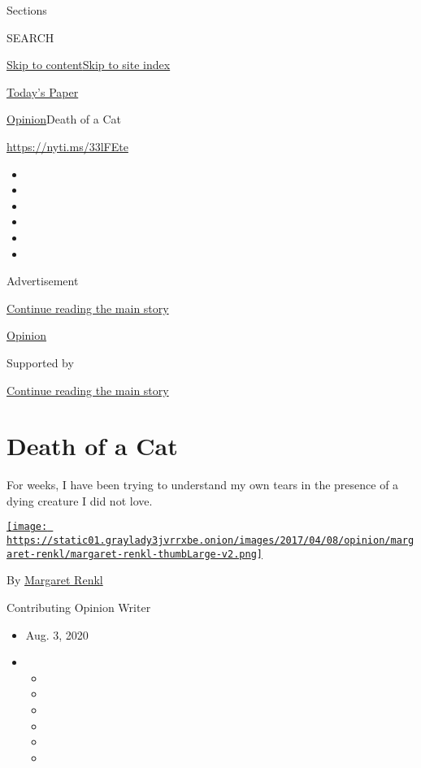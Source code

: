 Sections

SEARCH

\protect\hyperlink{site-content}{Skip to
content}\protect\hyperlink{site-index}{Skip to site index}

\href{https://myaccount.nytimes3xbfgragh.onion/auth/login?response_type=cookie\&client_id=vi}{}

\href{https://www.nytimes3xbfgragh.onion/section/todayspaper}{Today's
Paper}

\href{/section/opinion}{Opinion}\textbar{}Death of a Cat

\url{https://nyti.ms/33lFEte}

\begin{itemize}
\item
\item
\item
\item
\item
\item
\end{itemize}

Advertisement

\protect\hyperlink{after-top}{Continue reading the main story}

\href{/section/opinion}{Opinion}

Supported by

\protect\hyperlink{after-sponsor}{Continue reading the main story}

\hypertarget{death-of-a-cat}{%
\section{Death of a Cat}\label{death-of-a-cat}}

For weeks, I have been trying to understand my own tears in the presence
of a dying creature I did not love.

\href{https://www.nytimes3xbfgragh.onion/by/margaret-renkl}{\texttt{[image: https://static01.graylady3jvrrxbe.onion/images/2017/04/08/opinion/margaret-renkl/margaret-renkl-thumbLarge-v2.png]}}

By \href{https://www.nytimes3xbfgragh.onion/by/margaret-renkl}{Margaret
Renkl}

Contributing Opinion Writer

\begin{itemize}
\item
  Aug. 3, 2020
\item
  \begin{itemize}
  \item
  \item
  \item
  \item
  \item
  \item
  \end{itemize}
\end{itemize}

